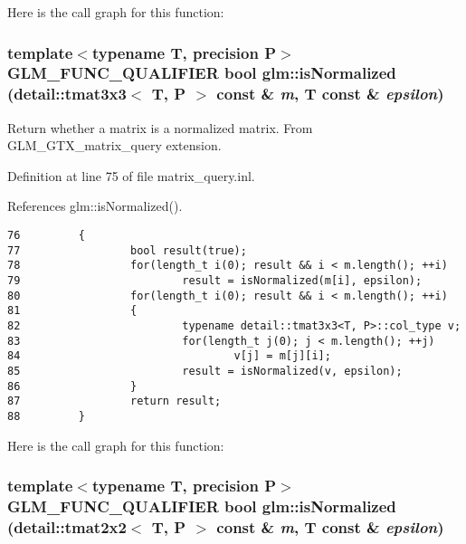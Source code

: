 Here is the call graph for this function:\hypertarget{group__gtx__matrix__query_g31396988209969ac17b2764cff154c36}{
\subsubsection[isNormalized]{\setlength{\rightskip}{0pt plus 5cm}template$<$typename T, precision P$>$ GLM\_\-FUNC\_\-QUALIFIER bool glm::isNormalized (detail::tmat3x3$<$ T, P $>$ const \& {\em m}, \/  T const \& {\em epsilon})}}
\label{group__gtx__matrix__query_g31396988209969ac17b2764cff154c36}


Return whether a matrix is a normalized matrix. From GLM\_\-GTX\_\-matrix\_\-query extension. 

Definition at line 75 of file matrix\_\-query.inl.

References glm::isNormalized().

\begin{Code}\begin{verbatim}76         {
77                 bool result(true);
78                 for(length_t i(0); result && i < m.length(); ++i)
79                         result = isNormalized(m[i], epsilon);
80                 for(length_t i(0); result && i < m.length(); ++i)
81                 {
82                         typename detail::tmat3x3<T, P>::col_type v;
83                         for(length_t j(0); j < m.length(); ++j)
84                                 v[j] = m[j][i];
85                         result = isNormalized(v, epsilon);
86                 }
87                 return result;
88         }
\end{verbatim}
\end{Code}




Here is the call graph for this function:\hypertarget{group__gtx__matrix__query_g08507235ac0ddb0a274ac1e1b10cbf39}{
\subsubsection[isNormalized]{\setlength{\rightskip}{0pt plus 5cm}template$<$typename T, precision P$>$ GLM\_\-FUNC\_\-QUALIFIER bool glm::isNormalized (detail::tmat2x2$<$ T, P $>$ const \& {\em m}, \/  T const \& {\em epsilon})}}
\label{group__gtx__matrix__query_g08507235ac0ddb0a274ac1e1b10cbf39}


